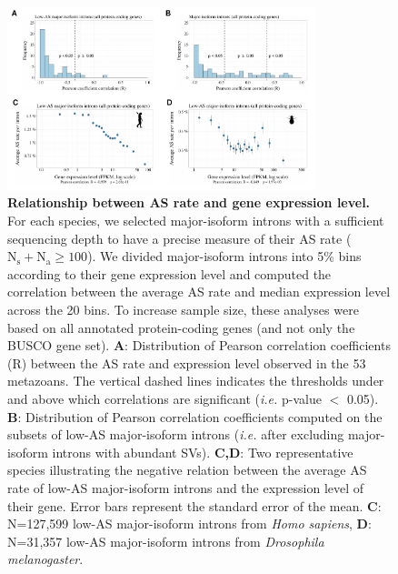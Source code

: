 \begin{figure}[t]   
    \centering                                                                                
        \includegraphics[width=0.8\textwidth] {Figure6.pdf}                                                           
    \caption[Relationship between AS rate and gene expression level]{\textbf{Relationship between AS rate and gene expression level.} For each species, we selected major-isoform introns with a sufficient sequencing depth to have a precise measure of their AS rate ($\mathrm{N_s+N_a}\geq100$). We divided major-isoform introns into 5\% bins according to their gene expression level and computed the correlation between the average AS rate and median expression level across the 20 bins. To increase sample size, these analyses were based on all annotated protein-coding genes (and not only the \acrshort{BUSCO} gene set). \textbf{A}: Distribution of Pearson correlation coefficients (R) between the AS rate and expression level observed in the 53 metazoans. The vertical dashed lines indicates the thresholds under and above which correlations are significant (\textit{i.e.} p-value $<$ 0.05). \textbf{B}: Distribution of Pearson correlation coefficients computed on the subsets of low-AS major-isoform introns  (\textit{i.e.} after excluding major-isoform introns with abundant \acrshort{SV}s). \textbf{C,D}: Two representative species illustrating the negative relation between the average AS rate of low-AS major-isoform introns and the expression level of their gene. Error bars represent the standard error of the mean. \textbf{C}: N=127,599 low-AS major-isoform introns from \textit{Homo sapiens}, \textbf{D}: N=31,357 low-AS major-isoform introns from \textit{Drosophila melanogaster}.\newline}
    \label{fig:AS6}
\end{figure}


